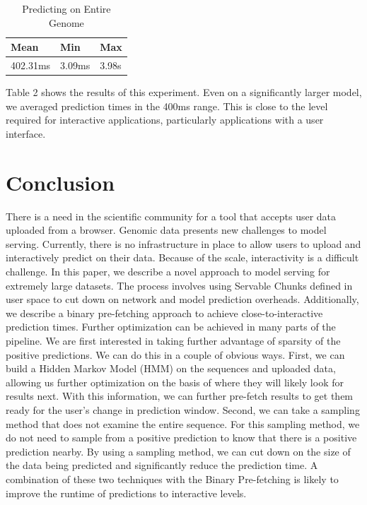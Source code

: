 \documentclass{sig-alternate-05-2015}
\begin{document}
\begin{table}[b]
\centering
\caption{Predicting on Entire Genome}
\label{tableresults}
\begin{tabular}{|l|l|l|}
\hline
\textbf{Mean} & \textbf{Min} & \textbf{Max} \\ \hline
402.31ms      & 3.09ms       & 3.98s       \\ \hline
\end{tabular}
\end{table}

Table 2 shows the results of this experiment. Even on a significantly larger model, we averaged prediction times in the 400ms range. This is close to the level required for interactive applications, particularly applications with a user interface.

\section{Conclusion}
There is a need in the scientific community for a tool that accepts user data uploaded from a browser. Genomic data presents new challenges to model serving. Currently, there is no infrastructure in place to allow users to upload and interactively predict on their data. Because of the scale, interactivity is a difficult challenge. In this paper, we describe a novel approach to model serving for extremely large datasets. The process involves using Servable Chunks defined in user space to cut down on network and model prediction overheads. Additionally, we describe a binary pre-fetching approach to achieve close-to-interactive prediction times. Further optimization can be achieved in many parts of the pipeline. We are first interested in taking further advantage of sparsity of the positive predictions. We can do this in a couple of obvious ways. First, we can build a Hidden Markov Model (HMM) on the sequences and uploaded data, allowing us further optimization on the basis of where they will likely look for results next. With this information, we can further pre-fetch results to get them ready for the user's change in prediction window. Second, we can take a sampling method that does not examine the entire sequence. For this sampling method, we do not need to sample from a positive prediction to know that there is a positive prediction nearby. By using a sampling method, we can cut down on the size of the data being predicted and significantly reduce the prediction time. A combination of these two techniques with the Binary Pre-fetching is likely to improve the runtime of predictions to interactive levels.
\end{document}
